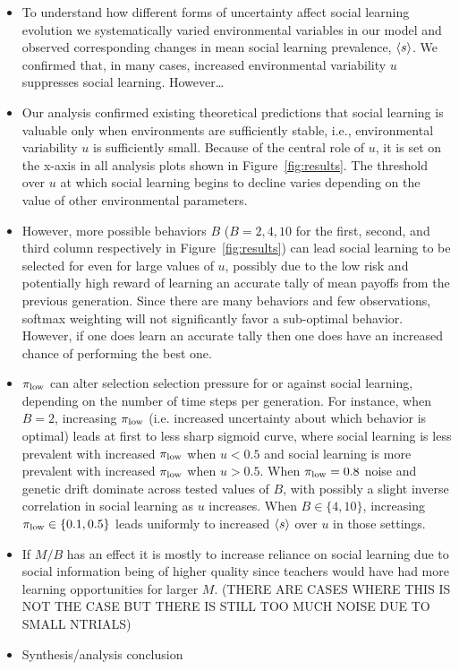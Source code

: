 \documentclass[letterpaper,11.5pt]{scrartcl}
\begin{document}
\begin{itemize}
  \item 
    To understand how different forms of uncertainty affect social learning evolution
    we systematically varied environmental variables in our model and observed
    corresponding changes in mean social learning prevalence, $\langle s \rangle$. We
    confirmed that, in many cases, increased environmental variability $u$ 
    suppresses social learning. However\ldots 


  \item 
    Our analysis confirmed existing theoretical predictions that social learning
    is valuable only when environments are sufficiently stable, i.e., 
    environmental variability $u$ is sufficiently small.
    Because of the central role of $u$, it is set on the x-axis in
    all analysis plots shown in Figure~\ref{fig:results}. 
    The threshold over $u$ at which social learning begins to decline
    varies depending on the value of other environmental parameters. 

  \item 
    However, more possible behaviors $B$ ($B=2,4,10$ for the first, second, and
    third column respectively in Figure~\ref{fig:results}) can lead
    social learning to be selected for even for large values of $u$, possibly
    due to the low risk and potentially high reward of learning an accurate
    tally of mean payoffs from the previous generation. 
    Since there are many behaviors and
    few observations, softmax weighting will not significantly 
    favor a sub-optimal behavior. However, if one does learn an accurate tally
    then one does have an increased chance of performing the best one.

  \item 
    $\pi_{\mathrm{low}}$ can alter selection selection pressure for or
    against social learning, depending on the number of time steps per generation.
    For instance, when $B=2$, increasing $\pi_{\mathrm{low}}$ (i.e. increased uncertainty
    about which behavior is optimal) leads at first to less sharp sigmoid curve, 
    where social learning is less prevalent with increased $\pi_{\mathrm{low}}$ when
    $u < 0.5$ and social learning is more prevalent with increased $\pi_{\mathrm{low}}$
    when $u > 0.5$. When $\pi_{\mathrm{low}} = 0.8$ noise and genetic drift dominate across
    tested values of $B$, with possibly a slight inverse correlation 
    in social learning as $u$ increases. When $B \in \{4,10\}$, increasing
    $\pi_{\mathrm{low}} \in \{0.1, 0.5\}$ leads uniformly to increased $\langle s \rangle$ over 
    $u$ in those settings.     

  \item
    If $M/B$ has an effect it is mostly to 
    increase reliance on social learning due to social information being of 
    higher quality since teachers would have had more learning opportunities
    for larger $M$. (THERE ARE CASES WHERE THIS IS NOT THE CASE BUT THERE IS 
    STILL TOO MUCH NOISE DUE TO SMALL NTRIALS)

  \item
    Synthesis/analysis conclusion 
    
\end{itemize}
\end{document}
